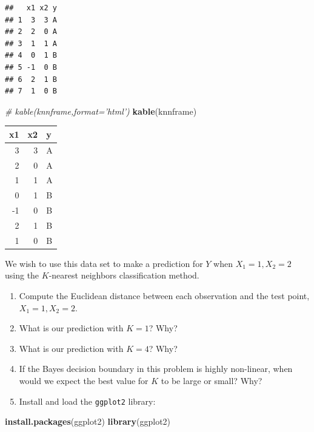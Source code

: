 \documentclass[]{article}
\newenvironment{Shaded}{\begin{snugshade}}{\end{snugshade}}
\newcommand{\KeywordTok}[1]{\textcolor[rgb]{0.13,0.29,0.53}{\textbf{#1}}}
\newcommand{\CommentTok}[1]{\textcolor[rgb]{0.56,0.35,0.01}{\textit{#1}}}
\newcommand{\NormalTok}[1]{#1}
\providecommand{\tightlist}{%
  \setlength{\itemsep}{0pt}\setlength{\parskip}{0pt}}
\begin{document}
\begin{verbatim}
##   x1 x2 y
## 1  3  3 A
## 2  2  0 A
## 3  1  1 A
## 4  0  1 B
## 5 -1  0 B
## 6  2  1 B
## 7  1  0 B
\end{verbatim}

\begin{Shaded}
\begin{Highlighting}[]
\CommentTok{# kable(knnframe,format='html')}
\KeywordTok{kable}\NormalTok{(knnframe)}
\end{Highlighting}
\end{Shaded}

\begin{tabular}{r|r|l}
\hline
x1 & x2 & y\\
\hline
3 & 3 & A\\
\hline
2 & 0 & A\\
\hline
1 & 1 & A\\
\hline
0 & 1 & B\\
\hline
-1 & 0 & B\\
\hline
2 & 1 & B\\
\hline
1 & 0 & B\\
\hline
\end{tabular}

We wish to use this data set to make a prediction for \(Y\) when
\(X_1=1, X_2=2\) using the \(K\)-nearest neighbors classification
method.

\begin{enumerate}
\def\labelenumi{\alph{enumi}.}
\tightlist
\item
  Compute the Euclidean distance between each observation and the test
  point, \(X_1=1,X_2=2\).
\item
  What is our prediction with \(K=1\)? Why?
\item
  What is our prediction with \(K=4\)? Why?
\item
  If the Bayes decision boundary in this problem is highly non-linear,
  when would we expect the best value for \(K\) to be large or small?
  Why?
\item
  Install and load the \texttt{ggplot2} library:
\end{enumerate}

\begin{Shaded}
\begin{Highlighting}[]
\KeywordTok{install.packages}\NormalTok{(ggplot2)}
\KeywordTok{library}\NormalTok{(ggplot2)}
\end{Highlighting}
\end{Shaded}
\end{document}
